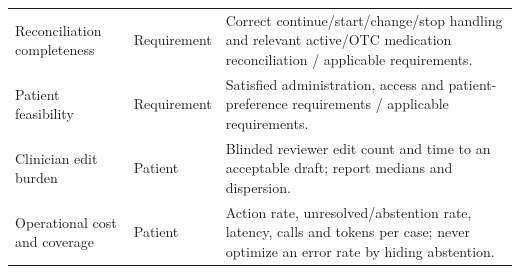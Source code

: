 \begin{table}[t]
\begin{tabularx}{\textwidth}{@{}p{3.4cm}p{1.4cm}X@{}}
Reconciliation completeness & Requirement & Correct continue/start/change/stop handling and relevant active/OTC medication reconciliation / applicable requirements.\\
Patient feasibility & Requirement & Satisfied administration, access and patient-preference requirements / applicable requirements.\\
Clinician edit burden & Patient & Blinded reviewer edit count and time to an acceptable draft; report medians and dispersion.\\
Operational cost and coverage & Patient & Action rate, unresolved/abstention rate, latency, calls and tokens per case; never optimize an error rate by hiding abstention.\\
\bottomrule\end{tabularx}\end{table}

